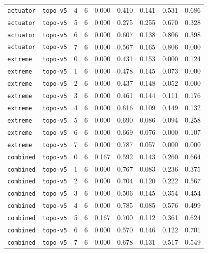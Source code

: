 \documentclass{article}
\begin{document}
\begin{center}
\begin{tabular}{lllcccccc}
\texttt{actuator} & \texttt{topo-v5} & 4 & 6 & 0.000 & 0.410 & 0.141 & 0.531 & 0.686 \\
\texttt{actuator} & \texttt{topo-v5} & 5 & 6 & 0.000 & 0.275 & 0.255 & 0.670 & 0.328 \\
\texttt{actuator} & \texttt{topo-v5} & 6 & 6 & 0.000 & 0.607 & 0.138 & 0.806 & 0.398 \\
\texttt{actuator} & \texttt{topo-v5} & 7 & 6 & 0.000 & 0.567 & 0.165 & 0.806 & 0.000 \\
\texttt{extreme} & \texttt{topo-v5} & 0 & 6 & 0.000 & 0.431 & 0.153 & 0.000 & 0.124 \\
\texttt{extreme} & \texttt{topo-v5} & 1 & 6 & 0.000 & 0.478 & 0.145 & 0.073 & 0.000 \\
\texttt{extreme} & \texttt{topo-v5} & 2 & 6 & 0.000 & 0.437 & 0.148 & 0.052 & 0.000 \\
\texttt{extreme} & \texttt{topo-v5} & 3 & 6 & 0.000 & 0.461 & 0.144 & 0.111 & 0.176 \\
\texttt{extreme} & \texttt{topo-v5} & 4 & 6 & 0.000 & 0.616 & 0.109 & 0.149 & 0.132 \\
\texttt{extreme} & \texttt{topo-v5} & 5 & 6 & 0.000 & 0.690 & 0.086 & 0.094 & 0.258 \\
\texttt{extreme} & \texttt{topo-v5} & 6 & 6 & 0.000 & 0.669 & 0.076 & 0.000 & 0.107 \\
\texttt{extreme} & \texttt{topo-v5} & 7 & 6 & 0.000 & 0.787 & 0.057 & 0.000 & 0.000 \\
\texttt{combined} & \texttt{topo-v5} & 0 & 6 & 0.167 & 0.592 & 0.143 & 0.260 & 0.664 \\
\texttt{combined} & \texttt{topo-v5} & 1 & 6 & 0.000 & 0.767 & 0.083 & 0.236 & 0.375 \\
\texttt{combined} & \texttt{topo-v5} & 2 & 6 & 0.000 & 0.704 & 0.120 & 0.222 & 0.567 \\
\texttt{combined} & \texttt{topo-v5} & 3 & 6 & 0.000 & 0.506 & 0.145 & 0.354 & 0.454 \\
\texttt{combined} & \texttt{topo-v5} & 4 & 6 & 0.000 & 0.785 & 0.085 & 0.576 & 0.499 \\
\texttt{combined} & \texttt{topo-v5} & 5 & 6 & 0.167 & 0.700 & 0.112 & 0.361 & 0.624 \\
\texttt{combined} & \texttt{topo-v5} & 6 & 6 & 0.000 & 0.570 & 0.146 & 0.122 & 0.701 \\
\texttt{combined} & \texttt{topo-v5} & 7 & 6 & 0.000 & 0.678 & 0.131 & 0.517 & 0.549 \\
\bottomrule
\end{tabular}
\end{center}
\end{document}
